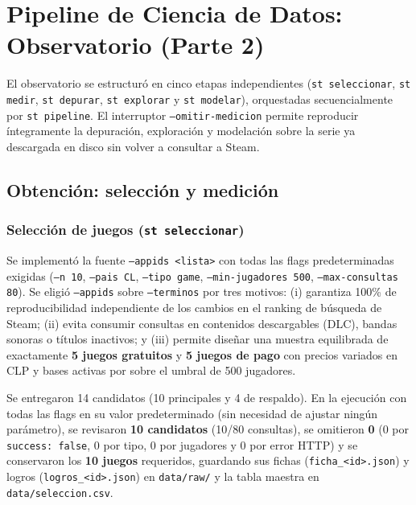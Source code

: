 \documentclass[11pt,a4paper]{article}
\begin{document}
\section{Pipeline de Ciencia de Datos: Observatorio (Parte 2)}

El observatorio se estructuró en cinco etapas independientes (\texttt{st seleccionar}, \texttt{st medir}, \texttt{st depurar}, \texttt{st explorar} y \texttt{st modelar}), orquestadas secuencialmente por \texttt{st pipeline}. El interruptor \texttt{--omitir-medicion} permite reproducir íntegramente la depuración, exploración y modelación sobre la serie ya descargada en disco sin volver a consultar a Steam.

\subsection{Obtención: selección y medición}

\subsubsection{Selección de juegos (\texttt{st seleccionar})}
Se implementó la fuente \texttt{--appids <lista>} con todas las flags predeterminadas exigidas (\texttt{--n 10}, \texttt{--pais CL}, \texttt{--tipo game}, \texttt{--min-jugadores 500}, \texttt{--max-consultas 80}). Se eligió \texttt{--appids} sobre \texttt{--terminos} por tres motivos: (i) garantiza 100\% de reproducibilidad independiente de los cambios en el ranking de búsqueda de Steam; (ii) evita consumir consultas en contenidos descargables (DLC), bandas sonoras o títulos inactivos; y (iii) permite diseñar una muestra equilibrada de exactamente \textbf{5 juegos gratuitos} y \textbf{5 juegos de pago} con precios variados en CLP y bases activas por sobre el umbral de 500 jugadores.

Se entregaron 14 candidatos (10 principales y 4 de respaldo). En la ejecución con todas las flags en su valor predeterminado (sin necesidad de ajustar ningún parámetro), se revisaron \textbf{10 candidatos} (10/80 consultas), se omitieron \textbf{0} (0 por \texttt{success: false}, 0 por tipo, 0 por jugadores y 0 por error HTTP) y se conservaron los \textbf{10 juegos} requeridos, guardando sus fichas (\texttt{ficha\_<id>.json}) y logros (\texttt{logros\_<id>.json}) en \texttt{data/raw/} y la tabla maestra en \texttt{data/seleccion.csv}.
\end{document}
